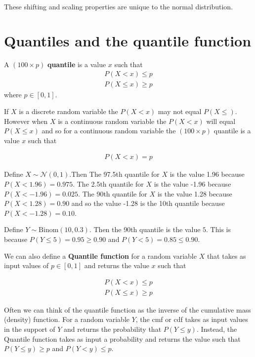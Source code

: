These shifting and scaling properties are unique to the normal distribution.

\section{Quantiles and the quantile function}

A $(100 \times p)$ \textbf{quantile} is a value $x$ such that 
\begin{align}
    P( X < x )    \leq p \\ 
    P( X \leq x ) \geq p 
\end{align}
where $p \in [0,1]$.

If $X$ is a discrete random variable the $P(X < x)$ may not equal $P(X \leq)$. However when $X$ is a continuous random variable the $P(X < x)$ will equal $P(X \leq x)$ and so for a continuous random variable the $(100 \times p)$ quantile is a value $x$ such that 

\begin{align}
    P( X < x ) =  p 
\end{align}

\ex Define $X \sim \mathcal{N}(0,1)$.Then The 97.5th quantile for $X$ is the value 1.96 because $P(X < 1.96) = 0.975$. The 2.5th quantile for $X$ is the value -1.96 because  $P(X < -1.96) = 0.025$. The 90th quantile for $X$ is the value 1.28 because $P(X < 1.28) = 0.90$ and so the value -1.28 is the 10th quantile because $P(X < -1.28) = 0.10$.

\ex Define $Y \sim \text{Binom}(10,0.3)$. Then the 90th quantile is the value $5$. This is because $P(Y \leq 5) = 0.95 \geq 0.90 $ and $P(Y < 5 ) = 0.85 \leq 0.90$.


We can also define a \textbf{Quantile function} for a random variable $X$ that takes as input values of $p \in [0,1]$ and returns the value $x$ such that 

\begin{align}
    P( X < x )    \leq p \\ 
    P( X \leq x ) \geq p 
\end{align}

Often we can think of the quantile function as the inverse of the cumulative mass (density) function. For a random variable $Y$, the cmf or cdf takes as input values in the support of $Y$ and returns the probability that $P(Y \leq y)$. Instead, the Quantile function takes as input a probability and returns the value such that $P( Y \leq y) \geq p$ and $P(Y < y) \leq p$.


